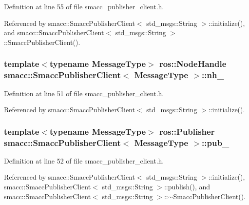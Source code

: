 Definition at line 55 of file smacc\+\_\+publisher\+\_\+client.\+h.



Referenced by smacc\+::\+Smacc\+Publisher\+Client$<$ std\+\_\+msgs\+::\+String $>$\+::initialize(), and smacc\+::\+Smacc\+Publisher\+Client$<$ std\+\_\+msgs\+::\+String $>$\+::\+Smacc\+Publisher\+Client().

\subsubsection[{\texorpdfstring{nh\+\_\+}{nh_}}]{\setlength{\rightskip}{0pt plus 5cm}template$<$typename Message\+Type$>$ ros\+::\+Node\+Handle {\bf smacc\+::\+Smacc\+Publisher\+Client}$<$ Message\+Type $>$\+::nh\+\_\+\hspace{0.3cm}{\ttfamily [protected]}}\hypertarget{classsmacc_1_1SmaccPublisherClient_a58839abaced6c78596843709ac1b017e}{}\label{classsmacc_1_1SmaccPublisherClient_a58839abaced6c78596843709ac1b017e}


Definition at line 51 of file smacc\+\_\+publisher\+\_\+client.\+h.



Referenced by smacc\+::\+Smacc\+Publisher\+Client$<$ std\+\_\+msgs\+::\+String $>$\+::initialize().

\subsubsection[{\texorpdfstring{pub\+\_\+}{pub_}}]{\setlength{\rightskip}{0pt plus 5cm}template$<$typename Message\+Type$>$ ros\+::\+Publisher {\bf smacc\+::\+Smacc\+Publisher\+Client}$<$ Message\+Type $>$\+::pub\+\_\+\hspace{0.3cm}{\ttfamily [protected]}}\hypertarget{classsmacc_1_1SmaccPublisherClient_a1ed34cdd0001bde76450ab4540b11808}{}\label{classsmacc_1_1SmaccPublisherClient_a1ed34cdd0001bde76450ab4540b11808}


Definition at line 52 of file smacc\+\_\+publisher\+\_\+client.\+h.



Referenced by smacc\+::\+Smacc\+Publisher\+Client$<$ std\+\_\+msgs\+::\+String $>$\+::initialize(), smacc\+::\+Smacc\+Publisher\+Client$<$ std\+\_\+msgs\+::\+String $>$\+::publish(), and smacc\+::\+Smacc\+Publisher\+Client$<$ std\+\_\+msgs\+::\+String $>$\+::$\sim$\+Smacc\+Publisher\+Client().

